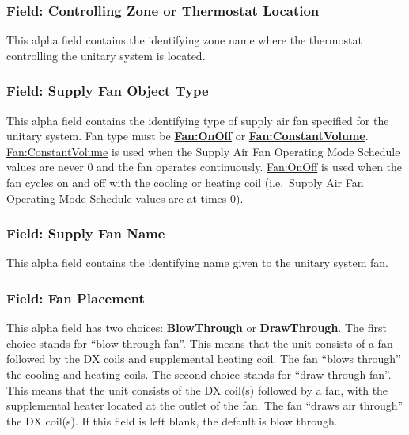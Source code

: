 \subsubsection{Field: Controlling Zone or Thermostat Location}\label{field-controlling-zone-or-thermostat-location-2}

This alpha field contains the identifying zone name where the thermostat controlling the unitary system is located.

\subsubsection{Field: Supply Fan Object Type}\label{field-supply-fan-object-type-2}

This alpha field contains the identifying type of supply air fan specified for the unitary system. Fan type must be \textbf{\hyperref[fanonoff]{Fan:OnOff}} or \textbf{\hyperref[fanconstantvolume]{Fan:ConstantVolume}}. \hyperref[fanconstantvolume]{Fan:ConstantVolume} is used when the Supply Air Fan Operating Mode Schedule values are never 0 and the fan operates continuously. \hyperref[fanonoff]{Fan:OnOff} is used when the fan cycles on and off with the cooling or heating coil (i.e.~Supply Air Fan Operating Mode Schedule values are at times 0).

\subsubsection{Field: Supply Fan Name}\label{field-supply-fan-name-2}

This alpha field contains the identifying name given to the unitary system fan.

\subsubsection{Field: Fan Placement}\label{field-fan-placement-2}

This alpha field has two choices: \textbf{BlowThrough} or \textbf{DrawThrough}. The first choice stands for ``blow through fan''. This means that the unit consists of a fan followed by the DX coils and supplemental heating coil. The fan ``blows through'' the cooling and heating coils. The second choice stands for ``draw through fan''. This means that the unit consists of the DX coil(s) followed by a fan, with the supplemental heater located at the outlet of the fan. The fan ``draws air through'' the DX coil(s). If this field is left blank, the default is blow through.

